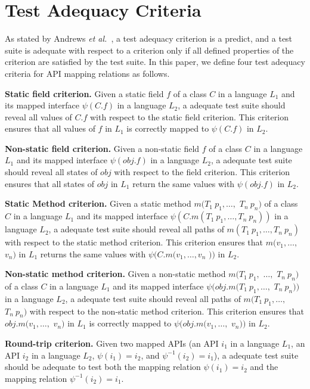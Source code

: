\section{Test Adequacy Criteria}
\label{sec:mapping}
As stated by Andrews \emph{et al.}~\cite{andrews2003test}, a test adequacy criterion is a predict, and a test suite is adequate with respect to a criterion only if all defined properties of the criterion are satisfied by the test suite. In this paper, we define four test adequacy criteria for API mapping relations as follows.

\textbf{Static field criterion.} Given a static field $f$ of a class $C$ in a language $L_1$ and its mapped interface $\psi(C.f)$ in a language $L_2$, a adequate test suite should reveal all values of $C.f$ with respect to the static field criterion. This criterion ensures that all values of $f$ in $L_1$ is correctly mapped to $\psi(C.f)$ in $L_2$.

\textbf{Non-static field criterion.} Given a non-static field $f$ of a class $C$ in a language $L_1$ and its mapped interface $\psi(obj.f)$ in a language $L_2$, a adequate test suite should reveal all states of $obj$ with respect to the field criterion. This criterion ensures that all states of $obj$ in $L_1$ return the same values with $\psi(obj.f)$ in $L_2$.

\textbf{Static Method criterion.} Given a static method $m(T_1\ p_1,\ldots,$ $T_n\ p_n)$ of a class $C$ in a language $L_1$ and its mapped interface $\psi(C.m(T_1\ p_1,\ldots,T_n\ p_n))$ in a language $L_2$, a adequate test suite should reveal all paths of $m(T_1\ p_1,\ldots,T_n\ p_n)$ with respect to the static method criterion. This criterion ensures that $m(v_1,\ldots,$ $v_n)$ in $L_1$ returns the same values with $\psi(C.m(v_1,\ldots,v_n$ $))$ in $L_2$.

\textbf{Non-static method criterion.} Given a non-static method $m(T_1\ p_1,$ $\ldots,$ $T_n\ p_n)$ of a class $C$ in a language $L_1$ and its mapped interface $\psi(obj.m(T_1\ p_1,\ldots,$ $T_n\ p_n))$ in a language $L_2$, a adequate test suite should reveal all paths of $m(T_1\ p_1,\ldots,$ $T_n\ p_n)$ with respect to the non-static method criterion. This criterion ensures that $obj.m(v_1,\ldots,$ $ v_n)$ in $L_1$ is correctly mapped to $\psi(obj.m(v_1,\ldots,$ $ v_n))$ in $L_2$.

\textbf{Round-trip criterion.} Given two mapped APIs (an API $i_1$ in a language $L_1$, an API $i_2$ in a language $L_2$, $\psi(i_1)=i_2$, and $\psi^{-1}(i_2)=i_1$), a adequate test suite should be adequate to test both the mapping relation $\psi(i_1)=i_2$ and the mapping relation $\psi^{-1}(i_2)=i_1$.
